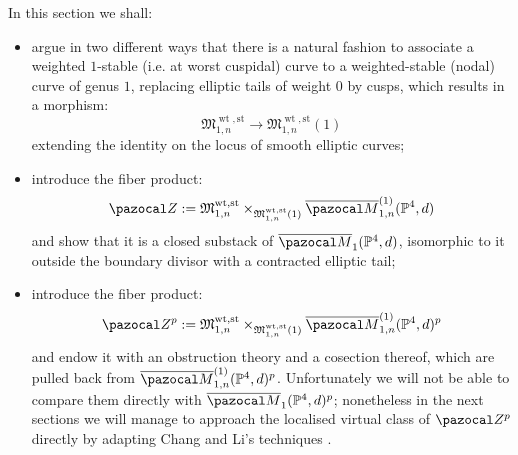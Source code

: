 \documentclass[11pt]{amsart}
\newcommand{\PP}{\mathbb P}
\renewcommand{\to}{\rightarrow}
\newcommand{\Z}{\pazocal Z}
\newcommand{\Zp}{\pazocal Z^p}
\newcommand{\oM}{\overline{\pazocal M}}
\theoremstyle{plain}
\theoremstyle{definition}
\begin{document}
In this section we shall:
\begin{itemize}
 \item argue in two different ways that there is a natural fashion to associate a weighted $1$-stable (i.e. at worst cuspidal) curve to a weighted-stable (nodal) curve of genus $1$, replacing elliptic tails of weight $0$ by cusps, which results in a morphism:
 \[\mathfrak M_{1,n}^{\operatorname{wt},\text{st}}\to\mathfrak M_{1,n}^{\operatorname{wt},\text{st}}(1)\]
extending the identity on the locus of smooth elliptic curves;
 \item introduce the fiber product:
 \[\Z:= \mathfrak M_{1,n}^{\operatorname{wt},\text{st}}\times_{\mathfrak M_{1,n}^{\operatorname{wt},\text{st}}(1)} \oM^{(1)}_{1,n}(\PP^4,d)\]
 and show that it is a closed substack of $\oM_1(\PP^4,d)$, isomorphic to it outside the boundary divisor with a contracted elliptic tail;
 \item introduce the fiber product:
 \[\Zp:=\mathfrak M_{1,n}^{\operatorname{wt},\text{st}}\times_{\mathfrak M_{1,n}^{\operatorname{wt},\text{st}}(1)} \oM^{(1)}_{1,n}(\PP^4,d)^p \]
 and endow it with an obstruction theory and a cosection thereof, which are pulled back from $\oM^{(1)}_{1,n}(\PP^4,d)^p$. Unfortunately we will not be able to compare them directly with $\oM_1(\PP^4,d)^p$; nonetheless in the next sections we will manage to approach the localised virtual class of $\Zp$ directly by adapting Chang and Li's techniques \cite{CL}.
\end{itemize}
\end{document}
